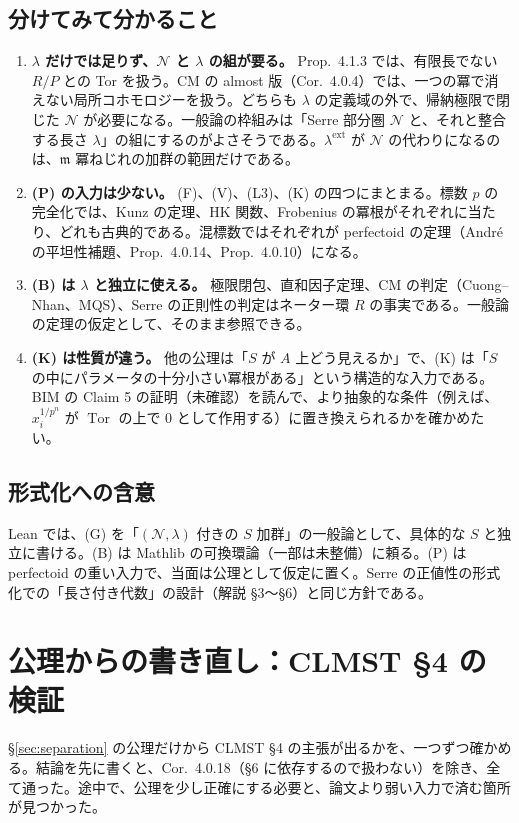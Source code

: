 \documentclass[11pt,a4paper]{ltjsarticle}
\theoremstyle{plain}
\theoremstyle{definition}
\theoremstyle{remark}
\theoremstyle{plain}
\newcommand{\m}{\mathfrak{m}}
\newcommand{\Tor}{\operatorname{Tor}}
\begin{document}
\subsection{分けてみて分かること}
\begin{enumerate}
  \item \textbf{$\lambda$ だけでは足りず、$\mathcal{N}$ と $\lambda$ の組が要る。} Prop.~4.1.3 では、有限長でない $R/P$ との Tor を扱う。CM の almost 版（Cor.~4.0.4）では、一つの冪で消えない局所コホモロジーを扱う。どちらも $\lambda$ の定義域の外で、帰納極限で閉じた $\mathcal{N}$ が必要になる。一般論の枠組みは「Serre 部分圏 $\mathcal{N}$ と、それと整合する長さ $\lambda$」の組にするのがよさそうである。$\lambda^{\mathrm{ext}}$ が $\mathcal{N}$ の代わりになるのは、$\m$ 冪ねじれの加群の範囲だけである。
  \item \textbf{(P) の入力は少ない。} (F)、(V)、(L3)、(K) の四つにまとまる。標数 $p$ の完全化では、Kunz の定理、HK 関数、Frobenius の冪根がそれぞれに当たり、どれも古典的である。混標数ではそれぞれが perfectoid の定理（André の平坦性補題、Prop.~4.0.14、Prop.~4.0.10）になる。
  \item \textbf{(B) は $\lambda$ と独立に使える。} 極限閉包、直和因子定理、CM の判定（Cuong--Nhan、MQS）、Serre の正則性の判定はネーター環 $R$ の事実である。一般論の定理の仮定として、そのまま参照できる。
  \item \textbf{(K) は性質が違う。} 他の公理は「$S$ が $A$ 上どう見えるか」で、(K) は「$S$ の中にパラメータの十分小さい冪根がある」という構造的な入力である。BIM の Claim 5 の証明（未確認）を読んで、より抽象的な条件（例えば、$x_i^{1/p^n}$ が $\Tor$ の上で $0$ として作用する）に置き換えられるかを確かめたい。
\end{enumerate}

\subsection{形式化への含意}
Lean では、(G) を「$(\mathcal{N},\lambda)$ 付きの $S$ 加群」の一般論として、具体的な $S$ と独立に書ける。(B) は Mathlib の可換環論（一部は未整備）に頼る。(P) は perfectoid の重い入力で、当面は公理として仮定に置く。Serre の正値性の形式化での「長さ付き代数」の設計（解説 §3〜§6）と同じ方針である。

\section{公理からの書き直し：CLMST \S 4 の検証}\label{sec:verify}

\S\ref{sec:separation} の公理だけから CLMST \S 4 の主張が出るかを、一つずつ確かめる。結論を先に書くと、Cor.~4.0.18（\S 6 に依存するので扱わない）を除き、全て通った。途中で、公理を少し正確にする必要と、論文より弱い入力で済む箇所が見つかった。
\end{document}
